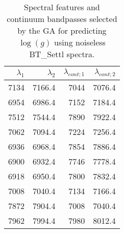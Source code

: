 \begin{table}
\begin{center}
\begin{tabular}{rrrr}
  \hline
  $\lambda_1$ & $\lambda_2$ & $\lambda_{cont;1}$ & $\lambda_{cont;2} $ \\ 
  \hline

7134 & 7166.4 &	7044 & 7076.4 \\
6954 & 6986.4 &	7152 & 7184.4 \\
7512 & 7544.4 &	7890 & 7922.4 \\
7062 & 7094.4 &	7224 & 7256.4 \\
6936 & 6968.4 &	7854 & 7886.4 \\
6900 & 6932.4 &	7746 & 7778.4 \\
6918 & 6950.4 &	7800 & 7832.4 \\
7008 & 7040.4 &	7134 & 7166.4 \\
7872 & 7904.4 &	7008 & 7040.4 \\
7962 & 7994.4 &	7980 & 8012.4 \\

\hline
\end{tabular}
\caption {Spectral features and continuum bandpasses selected by the GA for predicting $\log(g)$ 
using noiseless BT\_Settl spectra.} \label{tab:tab_SNRoo_G}
\end{center}
\end{table}

